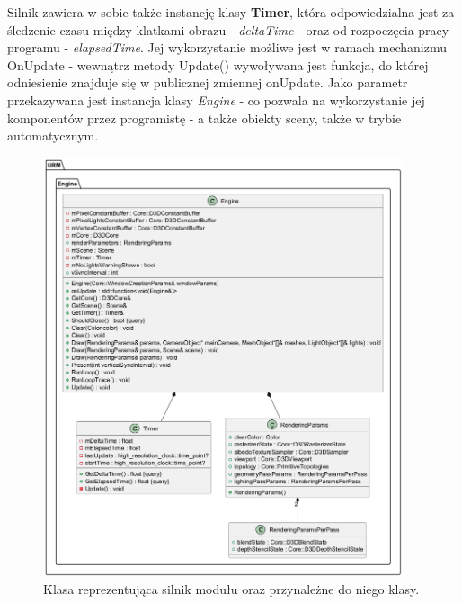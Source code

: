 	Silnik zawiera w sobie także instancję klasy \textbf{Timer}, która odpowiedzialna jest za śledzenie czasu między klatkami obrazu - \textit{deltaTime} - oraz od rozpoczęcia pracy programu - \textit{elapsedTime}. Jej wykorzystanie możliwe jest w ramach mechanizmu OnUpdate - wewnątrz metody Update() wywoływana jest funkcja, do której odniesienie znajduje się w publicznej zmiennej onUpdate. Jako parametr przekazywana jest instancja klasy \textit{Engine} - co pozwala na wykorzystanie jej komponentów przez programistę - a także obiekty sceny, także w trybie automatycznym.
	
	\begin{figure}[h!]
		\centering
		\includegraphics[width=400px]{images/UML/engine.png}
		\caption{Klasa reprezentująca silnik modułu oraz przynależne do niego klasy.}
		\label{UML_Engine}
	\end{figure}